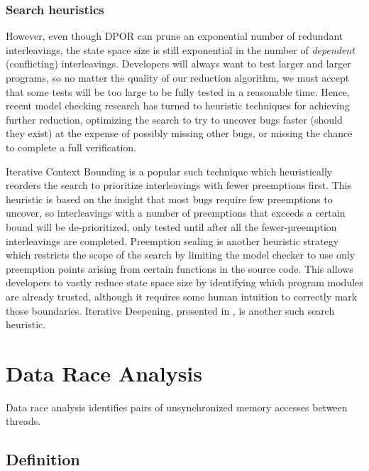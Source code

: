 \subsubsection{Search heuristics}

However, even though DPOR can prune an exponential number of redundant interleavings, the state space size is still exponential in the number of {\em dependent} (conflicting) interleavings.
Developers will always want to test larger and larger programs, so no matter the quality of our reduction algorithm,
we must accept that some tests will be too large to be fully tested in a reasonable time.
Hence, recent model checking research has turned to heuristic techniques for achieving further reduction,
optimizing the search to try to uncover bugs faster (should they exist)
at the expense of possibly missing other bugs,
or missing the chance to complete a full verification.

Iterative Context Bounding \cite{chess-icb} is a popular such technique which heuristically reorders the search to prioritize interleavings with fewer preemptions first.
This heuristic is based on the insight that most bugs require few preemptions to uncover, so interleavings with a number of preemptions that exceeds a certain bound will be de-prioritized, only tested until after all the fewer-preemption interleavings are completed.
Preemption sealing \cite{sealing} is another heuristic strategy which restricts the scope of the search by limiting the model checker to use only preemption points arising from certain functions in the source code.
This allows developers to vastly reduce state space size by identifying which program modules are already trusted,
although it requires some human intuition to correctly mark those boundaries.
Iterative Deepening, presented in , is another such search heuristic.


\section{Data Race Analysis}
\label{sec:background-datarace}

Data race analysis \cite{eraser} identifies pairs of unsynchronized memory accesses between threads.

\subsection{Definition}

